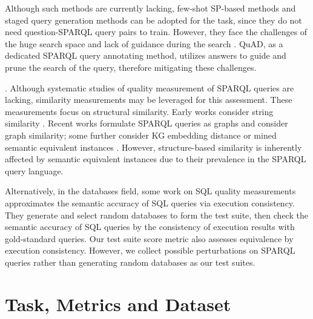 \documentclass[runningheads]{llncs}
\begin{document}
Although such methods are currently lacking, few-shot SP-based methods and staged query generation methods can be adopted for the task, since they do not need question-SPARQL query pairs to train.
However, they face the challenges of the huge search space and lack of guidance during the search \cite{chen2022outlining}.
QuAD, as a dedicated SPARQL query annotating method, utilizes answers to guide and prune the search of the query, therefore mitigating these challenges.

.
Although systematic studies of quality measurement of SPARQL queries are lacking, similarity measurements may be leveraged for this assessment. These measurements focus on structural similarity. Early works consider string similarity \cite{morsey2011sparqlbenchmark}.
Recent works formulate SPARQL queries as graphs and consider graph similarity; some further consider KG embedding distance \cite{wang2020similaritysearch} or mined semantic equivalent instances \cite{zheng2016similaritysearch}.
However, structure-based similarity is inherently affected by semantic equivalent instances due to their prevalence in the SPARQL query language. 

Alternatively, in the databases field, some work on SQL quality measurements approximates the semantic accuracy of SQL queries \cite{zhong2020semanticsql} via execution consistency. 
They generate and select random databases to form the test suite, then check the semantic accuracy of SQL queries by the consistency of execution results with gold-standard queries.
Our test suite score metric also assesses equivalence by execution consistency. However, we collect possible perturbations on SPARQL queries rather than generating random databases as our test suites.

\section{Task, Metrics and Dataset}\label{sec:task_and_metric}
\end{document}
